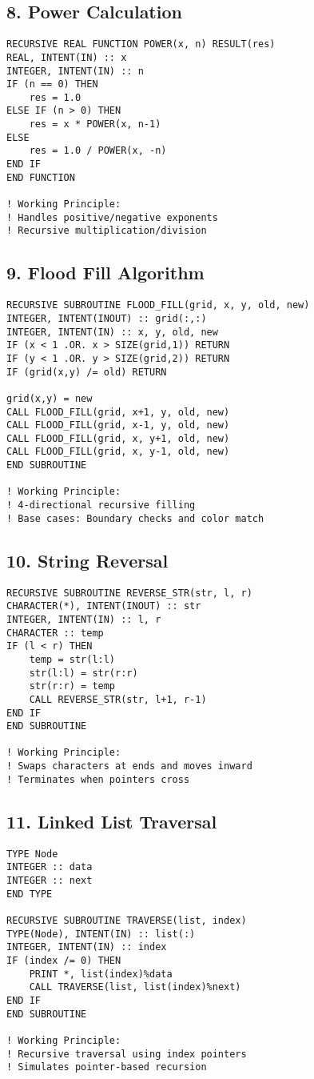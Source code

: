 \documentclass{book}
\begin{document}
\subsection*{8. Power Calculation}
\begin{verbatim}
RECURSIVE REAL FUNCTION POWER(x, n) RESULT(res)
REAL, INTENT(IN) :: x
INTEGER, INTENT(IN) :: n
IF (n == 0) THEN
    res = 1.0
ELSE IF (n > 0) THEN
    res = x * POWER(x, n-1)
ELSE
    res = 1.0 / POWER(x, -n)
END IF
END FUNCTION

! Working Principle:
! Handles positive/negative exponents
! Recursive multiplication/division
\end{verbatim}

\subsection*{9. Flood Fill Algorithm}
\begin{verbatim}
RECURSIVE SUBROUTINE FLOOD_FILL(grid, x, y, old, new)
INTEGER, INTENT(INOUT) :: grid(:,:)
INTEGER, INTENT(IN) :: x, y, old, new
IF (x < 1 .OR. x > SIZE(grid,1)) RETURN
IF (y < 1 .OR. y > SIZE(grid,2)) RETURN
IF (grid(x,y) /= old) RETURN

grid(x,y) = new
CALL FLOOD_FILL(grid, x+1, y, old, new)
CALL FLOOD_FILL(grid, x-1, y, old, new)
CALL FLOOD_FILL(grid, x, y+1, old, new)
CALL FLOOD_FILL(grid, x, y-1, old, new)
END SUBROUTINE

! Working Principle:
! 4-directional recursive filling
! Base cases: Boundary checks and color match
\end{verbatim}

\subsection*{10. String Reversal}
\begin{verbatim}
RECURSIVE SUBROUTINE REVERSE_STR(str, l, r)
CHARACTER(*), INTENT(INOUT) :: str
INTEGER, INTENT(IN) :: l, r
CHARACTER :: temp
IF (l < r) THEN
    temp = str(l:l)
    str(l:l) = str(r:r)
    str(r:r) = temp
    CALL REVERSE_STR(str, l+1, r-1)
END IF
END SUBROUTINE

! Working Principle:
! Swaps characters at ends and moves inward
! Terminates when pointers cross
\end{verbatim}

\subsection*{11. Linked List Traversal}
\begin{verbatim}
TYPE Node
INTEGER :: data
INTEGER :: next
END TYPE

RECURSIVE SUBROUTINE TRAVERSE(list, index)
TYPE(Node), INTENT(IN) :: list(:)
INTEGER, INTENT(IN) :: index
IF (index /= 0) THEN
    PRINT *, list(index)%data
    CALL TRAVERSE(list, list(index)%next)
END IF
END SUBROUTINE

! Working Principle:
! Recursive traversal using index pointers
! Simulates pointer-based recursion
\end{verbatim}
\end{document}
